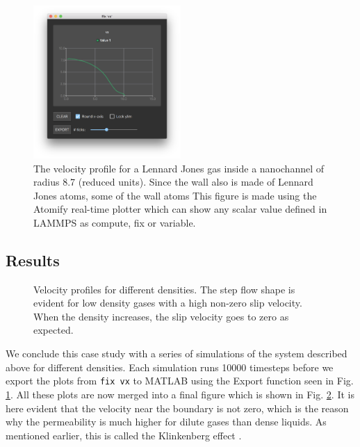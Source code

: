 \documentclass[aps,pre,twocolumn,letterpaper,floatfix,nofootinbib]{revtex4}
\newcommand{\code}[1]{\colorbox{light-gray}{\color{RawSienna}\texttt{#1}}}
\begin{document}
\begin{figure}
	\centering
	\includegraphics[width=0.5\textwidth]{lj_flow/08_velocity_profile1.png}
	\caption{
		The velocity profile for a Lennard Jones gas inside a nanochannel of radius 8.7 (reduced units).
		Since the wall also is made of Lennard Jones atoms, some of the wall atoms 
		This figure is made using the Atomify real-time plotter which can show any scalar value defined in LAMMPS
		as compute, fix or variable.
    }
	\label{fig:velocity_profile1}
\end{figure}

\subsection{Results}

\begin{figure}
	\centering
	\caption{
		Velocity profiles for different densities.
		The step flow shape is evident for low density gases with a high non-zero slip velocity.
		When the density increases, the slip velocity goes to zero as expected.
    }
	\label{fig:velocity_profiles}
\end{figure}

We conclude this case study with a series of simulations of the system described above for different densities.
Each simulation runs 10000 timesteps before we export the plots from \code{fix vx} to MATLAB using the Export function seen in Fig. \ref{fig:velocity_profile1}.
All these plots are now merged into a final figure which is shown in Fig. \ref{fig:velocity_profiles}.
It is here evident that the velocity near the boundary is not zero, which is the reason why the permeability is much higher for dilute gases than dense liquids.
As mentioned earlier, this is called the Klinkenberg effect \citep{klinkenberg1941permeability}.
\end{document}
